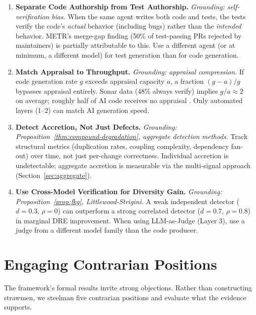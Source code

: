 \documentclass[11pt, a4paper, logo, copyright]{googledeepmind}
\begin{document}
\begin{enumerate}[label=\textbf{P\arabic*.}, leftmargin=3em]
\item \textbf{Separate Code Authorship from Test Authorship.}
\emph{Grounding: self-verification bias.}
When the same agent writes both code and tests, the tests verify the code's \emph{actual} behavior (including bugs) rather than the \emph{intended} behavior. METR's merge-gap finding (50\% of test-passing PRs rejected by maintainers) is partially attributable to this. Use a different agent (or at minimum, a different model) for test generation than for code generation.

\item \textbf{Match Appraisal to Throughput.}
\emph{Grounding: appraisal compression.}
If code generation rate $g$ exceeds appraisal capacity $a$, a fraction $(g-a)/g$ bypasses appraisal entirely. Sonar data (48\% always verify) implies $g/a \approx 2$ on average; roughly half of AI code receives no appraisal \citep{sonar2026}. Only automated layers (1--2) can match AI generation speed.

\item \textbf{Detect Accretion, Not Just Defects.}
\emph{Grounding: Proposition~\ref{thm:compound-degradation}, aggregate detection methods.}
Track structural metrics (duplication rates, coupling complexity, dependency fan-out) over time, not just per-change correctness. Individual accretion is undetectable; aggregate accretion is measurable via the multi-signal approach (Section~\ref{sec:aggregate}).

\item \textbf{Use Cross-Model Verification for Diversity Gain.}
\emph{Grounding: Proposition~\ref{prop:fkg}, Littlewood-Strigini.}
A weak independent detector ($d = 0.3$, $\rho = 0$) can outperform a strong correlated detector ($d = 0.7$, $\rho = 0.8$) in marginal DRE improvement. When using LLM-as-Judge (Layer 3), use a judge from a different model family than the code producer.

\end{enumerate}


\section{Engaging Contrarian Positions}
\label{sec:contrarian}

The framework's formal results invite strong objections. Rather than constructing strawmen, we steelman five contrarian positions and evaluate what the evidence supports.
\end{document}
